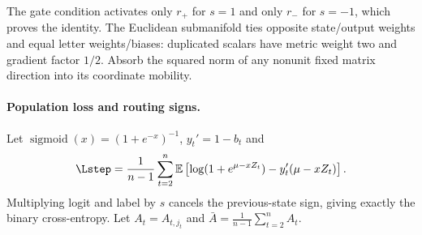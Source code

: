 The gate condition activates only $r_+$ for $s=1$ and only $r_-$ for $s=-1$,
which proves the identity. The Euclidean submanifold ties opposite
state/output weights and equal letter weights/biases: duplicated scalars
have metric weight two and gradient factor $1/2$. Absorb the squared norm
of any nonunit fixed matrix direction into its coordinate mobility.

\paragraph{Population loss and routing signs.}
\label{app:weak-routing-signs}

Let $\operatorname{sigmoid}(x)=(1+e^{-x})^{-1}$, $y_t'=1-b_t$ and
\begin{equation}\label{eq:lr-logistic-risk}
 \Lstep=\frac1{n-1}\sum_{t=2}^n\mathbb E
 \left[\log(1+e^{\mu-xZ_t})-y_t'(\mu-xZ_t)\right].
\end{equation}
Multiplying logit and label by $s$ cancels the previous-state sign, giving exactly the binary cross-entropy.
Let $A_t=A_{t,j_t}$ and $\bar A=\frac1{n-1}\sum_{t=2}^n A_t$.

